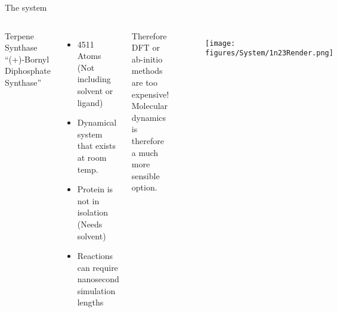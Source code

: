
\begin{frame}{The system}
\begin{columns}
Terpene Synthase \enquote{(+)-Bornyl Diphosphate Synthase}
\begin{itemize}
	\item 4511 Atoms (Not including solvent or ligand)
	\item Dynamical system that exists at room temp.
	\item Protein is not in isolation (Needs solvent)
	\item Reactions can require nanosecond simulation lengths
\end{itemize}
\vspace{1cm}
Therefore DFT or ab-initio methods are too expensive!
Molecular dynamics is therefore a much more sensible option.
\begin{figure}
\texttt{[image: figures/System/1n23Render.png]}
\end{figure}

\end{columns}
\end{frame}

